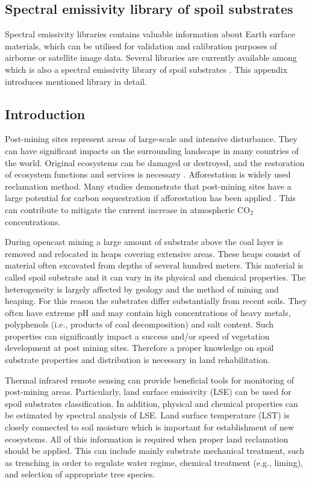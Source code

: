 \begin{appendices}

\chapter{Spectral emissivity library of spoil substrates}
\label{app:Library}

Spectral emissivity libraries contains valuable information about Earth surface materials, which can be utilised for validation and calibration purposes of airborne or satellite image data. Several libraries are currently available among which is also a spectral emissivity library of spoil substrates \cite{PP16}. This appendix introduces mentioned library in detail.

\section{Introduction}

Post-mining sites represent areas of large-scale and intensive disturbance. They can have significant impacts on the surrounding landscape in many countries of the world. Original ecosystems can be damaged or destroyed, and the restoration of ecosystem functions and services is necessary \cite{BH01}. Afforestation is widely used reclamation method. Many studies demonstrate that post-mining sites have a large potential for carbon sequestration if afforestation has been applied \cite{VF13, FL13, SL05, UL06}. This can contribute to mitigate the current increase in atmospheric $\mathrm{CO_2}$ concentrations.

During opencast mining a large amount of substrate above the coal layer is removed and relocated in heaps covering extensive areas. These heaps consist of material often excavated from depths of several hundred meters. This material is called spoil substrate and it can vary in its physical and chemical properties. The heterogeneity is largely affected by geology and the method of mining and heaping. For this reason the substrates differ substantially from recent soils. They often have extreme pH and may contain high concentrations of heavy metals, polyphenols (i.e., products of coal decomposition) and salt content. Such properties can significantly impact a success and/or speed of vegetation development at post mining sites. Therefore a proper knowledge on spoil substrate properties and distribution is necessary in land rehabilitation. 

Thermal infrared remote sensing can provide beneficial tools for monitoring of post-mining areas. Particularly, land surface emissivity (LSE) can be used for spoil substrates classification. In addition, physical and chemical properties can be estimated by spectral analysis of LSE. Land surface temperature (LST) is closely connected to soil moisture which is important for establishment of new ecosystems. All of this information is required when proper land reclamation should be applied. This can include mainly substrate mechanical treatment, such as trenching in order to regulate water regime, chemical treatment (e.g., liming), and selection of appropriate tree species.


\end{appendices}
